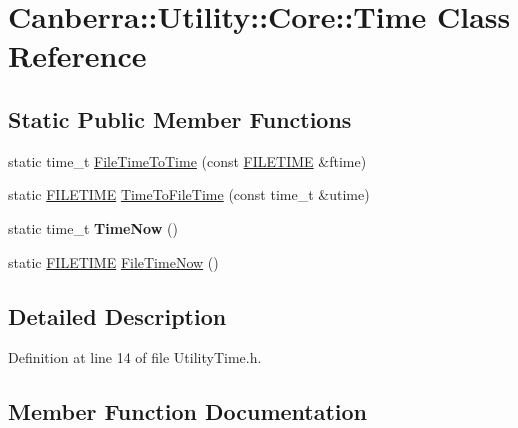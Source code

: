 \hypertarget{class_canberra_1_1_utility_1_1_core_1_1_time}{}\section{Canberra\+:\+:Utility\+:\+:Core\+:\+:Time Class Reference}
\label{class_canberra_1_1_utility_1_1_core_1_1_time}
\subsection*{Static Public Member Functions}
\begin{DoxyCompactItemize}
\item 
static time\+\_\+t \hyperlink{class_canberra_1_1_utility_1_1_core_1_1_time_a5d4ac0089f3037decf175287aa256cce_a5d4ac0089f3037decf175287aa256cce}{File\+Time\+To\+Time} (const \hyperlink{struct___f_i_l_e_t_i_m_e}{F\+I\+L\+E\+T\+I\+ME} \&ftime)
\item 
static \hyperlink{struct___f_i_l_e_t_i_m_e}{F\+I\+L\+E\+T\+I\+ME} \hyperlink{class_canberra_1_1_utility_1_1_core_1_1_time_aaf783c2dc41f7380e8e7cd5b19b732f8_aaf783c2dc41f7380e8e7cd5b19b732f8}{Time\+To\+File\+Time} (const time\+\_\+t \&utime)
\item 
\mbox{\label{class_canberra_1_1_utility_1_1_core_1_1_time_ae9ce61af15222adb1406d3f83c4b558e}} 
static time\+\_\+t {\bfseries Time\+Now} ()
\item 
static \hyperlink{struct___f_i_l_e_t_i_m_e}{F\+I\+L\+E\+T\+I\+ME} \hyperlink{class_canberra_1_1_utility_1_1_core_1_1_time_a4c2cfbbeb92111cd25fba404e9d5261f_a4c2cfbbeb92111cd25fba404e9d5261f}{File\+Time\+Now} ()
\end{DoxyCompactItemize}


\subsection{Detailed Description}


Definition at line 14 of file Utility\+Time.\+h.



\subsection{Member Function Documentation}
\mbox{\label{class_canberra_1_1_utility_1_1_core_1_1_time_a4c2cfbbeb92111cd25fba404e9d5261f_a4c2cfbbeb92111cd25fba404e9d5261f}} 
